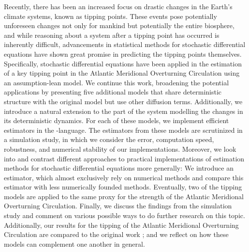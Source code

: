 \noindent Recently, there has been an increased focus on drastic changes in the Earth's climate systems, known as tipping points. These events pose potentially unforeseen changes not only for mankind but potentially the entire biosphere, and while reasoning about a system after a tipping point has occurred is inherently difficult, advancements in statistical methods for stochastic differential equations \cite{SplittingSchemes} have shown great promise in predicting the tipping points themselves. Specifically, stochastic differential equations have been applied in the estimation of a key tipping point in the Atlantic Meridional Overturning Circulation \cite{Ditlevsen2023} using an assumption-lean model.  We continue this work, broadening the potential applications by presenting five additional models that share deterministic structure with the original model but use other diffusion terms. Additionally, we introduce a natural extension to the part of the system modelling the changes in its deterministic dynamics. For each of these models, we implement efficient estimators in the -language\cite{Rlang}. The estimators from these models are scrutinized in a simulation study, in which we consider the error, computation speed, robustness, and numerical stability of our implementations. Moreover, we look into and contrast different approaches to practical implementations of estimation methods for stochastic differential equations more generally: We introduce an estimator, which almost exclusively rely on numerical methods and compare this estimator with less numerically founded methods. Eventually, two of the tipping models are applied to the same proxy for the strength of the Atlantic Meridional Overturning Circulation. Finally, we discuss the findings from the simulation study and comment on various possible ways to do further research on this topic. Additionally, our results for the tipping of the Atlantic Meridional Overturning Circulation are compared to the original work \cite{Ditlevsen2023}; and we reflect on how these models can complement one another in general.